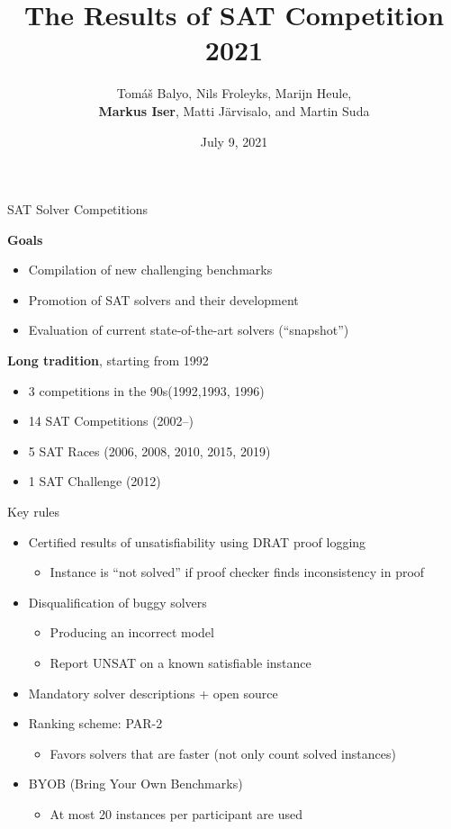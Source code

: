 \documentclass[trans]{beamer}
\title[SAT Competition 2021]{The Results of SAT Competition 2021}
\author[Balyo, Froleyks, Heule, Iser, J\"{a}rvisalo, Suda] {Tom{\'a}{\v s} Balyo, Nils Froleyks, Marijn Heule,\\
{\bf Markus Iser}, Matti J\"{a}rvisalo, and Martin Suda}
\institute[] %
{
SAT 2021 Conference, Barcelona (Spain), +Cyberspace \\ %
}
\date{July 9, 2021} %
\begin{document}
\begin{frame}
\titlepage %
\end{frame}

\begin{frame}{SAT Solver Competitions}

{\bf Goals}
\begin{itemize}
\item Compilation of new challenging benchmarks
\item Promotion of SAT solvers and their development
\item Evaluation of current state-of-the-art solvers (``snapshot'')
\end{itemize}

\bigskip

{\bf Long tradition}, starting from 1992
\begin{itemize}
\item 3 competitions in the 90s\hfill (1992,1993, 1996)
\item 14 SAT Competitions \hfill (2002--)
\item 5 SAT Races \hfill (2006, 2008, 2010, 2015, 2019)
\item 1 SAT Challenge \hfill (2012)
\end{itemize}

\end{frame}


\begin{frame}{Key rules}

\begin{itemize}
\item Certified results of unsatisfiability using DRAT proof logging
  \begin{itemize}
  \item Instance is ``not solved'' if proof checker finds inconsistency in proof
  \end{itemize}
\medskip
\item Disqualification of buggy solvers
  \begin{itemize}
  \item Producing an incorrect model
  \item Report UNSAT on a known satisfiable instance
  \end{itemize}
\medskip
\item Mandatory solver descriptions + open source
\medskip
\item Ranking scheme: PAR-2
\begin{itemize}
\item Favors solvers that are faster (not only count solved instances)
\end{itemize}
\medskip
\item BYOB (Bring Your Own Benchmarks)
\begin{itemize}
\item At most 20 instances per participant are used
\end{itemize} 
\end{itemize}

\end{frame}
\end{document}
